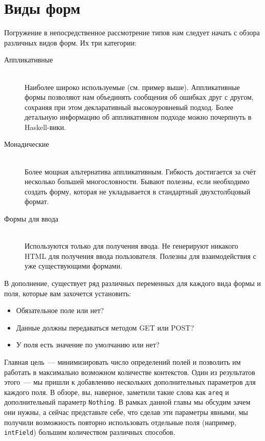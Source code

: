 \section{Виды форм}
Погружение в непосредственное рассмотрение типов нам следует начать с обзора
различных видов форм. Их три категории:
\begin{description}
    \item[Аппликативные] \hfill \\
        Наиболее широко используемые (см. пример выше). Аппликативные формы
        позволяют нам объединять сообщения об ошибках друг с другом, сохраняя
        при этом декларативный высокоуровневый подход. Более детальную
        информацию об аппликативном подходе можно почерпнуть
        в~%
        {Haskell-вики}.

    \item[Монадические] \hfill \\
        Более мощная альтернатива аппликативным. Гибкость достигается за счёт
        несколько большей многословности. Бывают полезны, если необходимо
        создать форму, которая не укладывается в стандартный двухстолбцовый
        формат.

    \item[Формы для ввода] \hfill \\
        Используются только для получения ввода. Не генерируют никакого HTML для
        получения ввода пользователя. Полезны для взаимодействия с уже
        существующими формами.
\end{description}

В дополнение, существует ряд различных переменных для каждого вида формы и поля,
которые вам захочется установить:
\begin{itemize}
    \item Обязательное поле или нет?
    \item Данные должны передаваться методом GET или POST?
    \item У поля есть значение по умолчанию или нет?
\end{itemize}

Главная цель~--- минимизировать число определений полей и позволить им
работать в максимально возможном количестве контекстов. Один из результатов
этого~--- мы пришли к добавлению нескольких дополнительных параметров для
каждого поля. В обзоре, вы, наверное, заметили такие слова как
\lstinline'areq' и дополнительный параметр \lstinline'Nothing'. В рамках
данной главы мы обсудим зачем они нужны, а сейчас представьте себе, что сделав
эти параметры явными, мы получили возможность повторно использовать отдельные
поля (например,~%
%
{\lstinline'intField'}) большим количеством различных способов.

